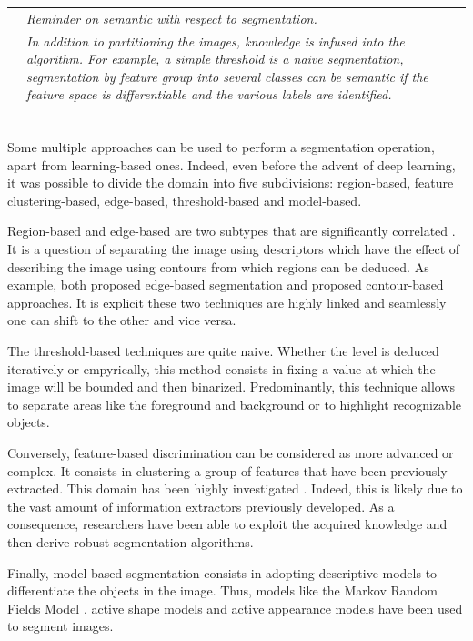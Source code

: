 {
\begin{tabular}[h]{p{}!{\color{gray}\vrule width 2pt}p{0.7\textwidth}}
	 &\textit{Reminder on semantic with respect to segmentation.}\\
	 &\textit{In addition to partitioning the images, knowledge is infused into the algorithm. For example, a simple threshold is a naive segmentation, segmentation by feature group into several classes can be semantic if the feature space is differentiable and the various labels are identified. }\\
\end{tabular}
}\\


Some multiple approaches can be used to perform a segmentation operation, apart from learning-based ones. Indeed, even before the advent of deep learning, it was possible to divide the domain into five subdivisions: region-based, feature clustering-based, edge-based, threshold-based and model-based.

Region-based and edge-based are two subtypes that are significantly correlated \cite{kaganami2009region,chu1990integration}. It is a question of separating the image using descriptors which have the effect of describing the image using contours from which regions can be deduced. As example, \cite{iannizzotto2000fast, sappa2006unsupervised} both proposed edge-based segmentation and \cite{wani1994edge, mukherjee2014region} proposed contour-based approaches. It is explicit these two techniques are highly linked and seamlessly one can shift to the other and vice versa.


The threshold-based techniques \cite{bhargavi2014survey} are quite naive. Whether the level is deduced iteratively or empyrically, this method consists in fixing a value at which the image will be bounded and then binarized. Predominantly, this technique allows to separate areas like the foreground and background or to highlight recognizable objects.


Conversely, feature-based discrimination can be considered as more advanced or complex. It consists in clustering a group of features that have been previously extracted. This domain has been highly investigated \cite{watt1986feature,li2006new,rashedi2013stochastic}. Indeed, this is likely due to the vast amount of information extractors previously developed. As a consequence, researchers have been able to exploit the acquired knowledge and then derive robust segmentation algorithms.


Finally, model-based segmentation consists in adopting descriptive models to differentiate the objects in the image. Thus, models like the Markov Random Fields Model \cite{marroquin2003hidden}, active shape models \cite{van2002active} and active appearance models have been used to segment images\cite{cootes2001active}.


